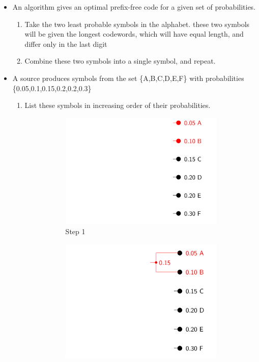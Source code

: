 \documentclass[24pt]{article}
\begin{document}
\begin{itemize}
\item An algorithm gives an optimal prefix-free code for a given set of probabilities.
\begin{enumerate}
\item Take the two least probable symbols in the alphabet. these two symbols will be given the longest codewords, which will have equal length, and differ only in the last digit
\item Combine these two symbols into a single symbol, and repeat.
\end{enumerate}

\item A source produces symbols from the set \{A,B,C,D,E,F\} with probabilities \{0.05,0.1,0.15,0.2,0.2,0.3\}
\begin{enumerate}
\item List these symbols in increasing order of their probabilities.
\begin{figure}[h]
\begin{subfigure}[h]{0.3\linewidth}
  \includegraphics[width=\linewidth]{Huff1.png}
  \caption{Step 1}
\end{subfigure}
\begin{subfigure}[h]{0.3\linewidth}
  \includegraphics[width=\linewidth] {Huff2.png}

\end{subfigure}
\end{figure}
\end{enumerate}
\end{itemize}
\end{document}
